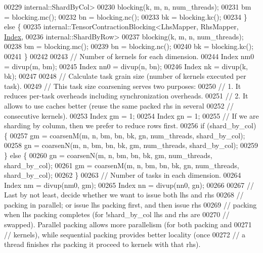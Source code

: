 \begin{DoxyCode}
00229                                           internal::ShardByCol>
00230           blocking(k, m, n, num\_threads);
00231       bm = blocking.mc();
00232       bn = blocking.nc();
00233       bk = blocking.kc();
00234     \} \textcolor{keywordflow}{else} \{
00235       internal::TensorContractionBlocking<LhsMapper, RhsMapper, \hyperlink{namespace_eigen_a62e77e0933482dafde8fe197d9a2cfde}{Index},
00236                                           internal::ShardByRow>
00237           blocking(k, m, n, num\_threads);
00238       bm = blocking.mc();
00239       bn = blocking.nc();
00240       bk = blocking.kc();
00241     \}
00242 
00243     \textcolor{comment}{// Number of kernels for each dimension.}
00244     Index nm0 = divup(m, bm);
00245     Index nn0 = divup(n, bn);
00246     Index nk = divup(k, bk);
00247 
00248     \textcolor{comment}{// Calculate task grain size (number of kernels executed per task).}
00249     \textcolor{comment}{// This task size coarsening serves two purposes:}
00250     \textcolor{comment}{// 1. It reduces per-task overheads including synchronization overheads.}
00251     \textcolor{comment}{// 2. It allows to use caches better (reuse the same packed rhs in several}
00252     \textcolor{comment}{// consecutive kernels).}
00253     Index gm = 1;
00254     Index gn = 1;
00255     \textcolor{comment}{// If we are sharding by column, then we prefer to reduce rows first.}
00256     \textcolor{keywordflow}{if} (shard\_by\_col) \{
00257       gm = coarsenM(m, n, bm, bn, bk, gn, num\_threads, shard\_by\_col);
00258       gn = coarsenN(m, n, bm, bn, bk, gm, num\_threads, shard\_by\_col);
00259     \} \textcolor{keywordflow}{else} \{
00260       gn = coarsenN(m, n, bm, bn, bk, gm, num\_threads, shard\_by\_col);
00261       gm = coarsenM(m, n, bm, bn, bk, gn, num\_threads, shard\_by\_col);
00262     \}
00263     \textcolor{comment}{// Number of tasks in each dimension.}
00264     Index nm = divup(nm0, gm);
00265     Index nn = divup(nn0, gn);
00266 
00267     \textcolor{comment}{// Last by not least, decide whether we want to issue both lhs and rhs}
00268     \textcolor{comment}{// packing in parallel; or issue lhs packing first, and then issue rhs}
00269     \textcolor{comment}{// packing when lhs packing completes (for !shard\_by\_col lhs and rhs are}
00270     \textcolor{comment}{// swapped). Parallel packing allows more parallelism (for both packing and}
00271     \textcolor{comment}{// kernels), while sequential packing provides better locality (once}
00272     \textcolor{comment}{// a thread finishes rhs packing it proceed to kernels with that rhs).}

\end{DoxyCode}
